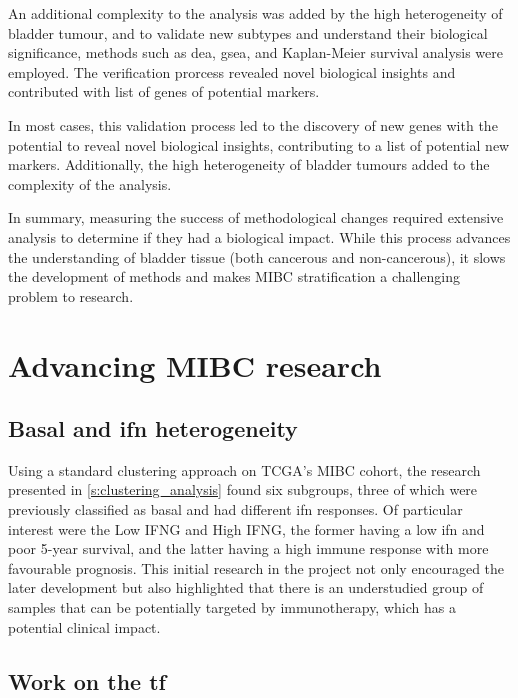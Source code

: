 An additional complexity to the analysis was added by the high heterogeneity of bladder tumour, and to validate new subtypes and understand their biological significance, methods such as \acrlong{dea}, \acrlong{gsea}, and Kaplan-Meier survival analysis were employed. The verification prorcess revealed novel biological insights and contributed with list of genes of potential markers.

In most cases, this validation process led to the discovery of new genes with the potential to reveal novel biological insights, contributing to a list of potential new markers. Additionally, the high heterogeneity of bladder tumours added to the complexity of the analysis.

In summary, measuring the success of methodological changes required extensive analysis to determine if they had a biological impact. While this process advances the understanding of bladder tissue (both cancerous and non-cancerous), it slows the development of methods and makes MIBC stratification a challenging problem to research.


\section{Advancing MIBC research}

\subsection*{Basal and \acrlong{ifn} heterogeneity}

Using a standard clustering approach on TCGA's MIBC cohort, the research presented in \cref{s:clustering_analysis} found six subgroups, three of which were previously classified as basal and had different \acrshort{ifn} responses. Of particular interest were the Low IFNG and High IFNG, the former having a low \acrshort{ifn} and poor 5-year survival, and the latter having a high immune response with more favourable prognosis. This initial research in the project not only encouraged the later development but also highlighted that there is an understudied group of samples that can be potentially targeted by immunotherapy, which has a potential clinical impact.


\subsection*{Work on the \acrlong{tf}}

